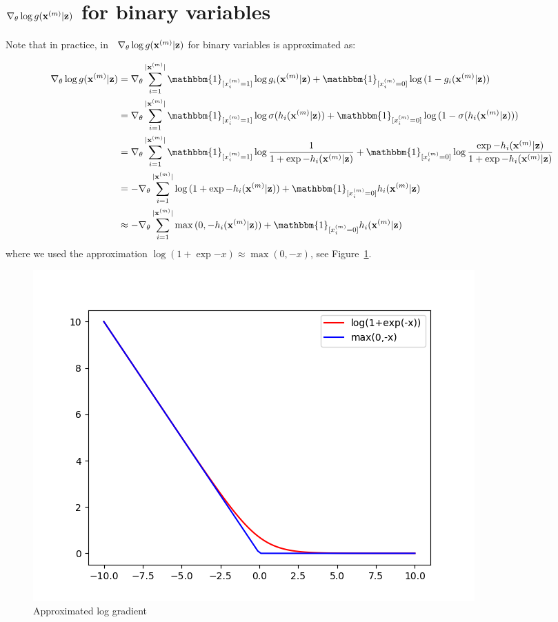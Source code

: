 \documentclass{article}
\begin{document}
\section{$\nabla_\theta\log{g({\mathbf x}^{(m)}|{\mathbf z})}$ for binary variables}

Note that in practice, in~\cite{bgan}
$\nabla_\theta\log{g({\mathbf x}^{(m)}|{\mathbf z})}$ for binary variables is
approximated as:

\begin{align*}
\nabla_\theta\log{g(\x^{(m)}|\z)} & = \nabla_\theta \sum_{i=1}^{|\x^{(m)}|} \mathbbm{1}_{[x_i^{(m)} = 1]} \log{g_i(\x^{(m)}|\z)} + \mathbbm{1}_{[x_i^{(m)} = 0]} \log{(1 - g_i(\x^{(m)}|\z))} \\
& = \nabla_\theta \sum_{i=1}^{|\x^{(m)}|} \mathbbm{1}_{[x_i^{(m)} = 1]} \log{\sigma(h_i(\x^{(m)}|\z))} + \mathbbm{1}_{[x_i^{(m)} = 0]} \log{(1 - \sigma(h_i(\x^{(m)}|\z)))} \\
& =  \nabla_\theta \sum_{i=1}^{|\x^{(m)}|} \mathbbm{1}_{[x_i^{(m)} = 1]} \log{\frac{1}{1+\exp{-h_i(\x^{(m)}|\z)}}}+ \mathbbm{1}_{[x_i^{(m)} = 0]} \log{\frac{\exp{-h_i(\x^{(m)}|\z)}}{1+\exp{-h_i(\x^{(m)}|\z)}}} \\                                
& =  - \nabla_\theta \sum_{i=1}^{|\x^{(m)}|}\log{(1+\exp{-h_i(\x^{(m)}|\z)})} + \mathbbm{1}_{[x_i^{(m)} = 0]}h_i(\x^{(m)}|\z) \\
& \approx  - \nabla_\theta \sum_{i=1}^{|\x^{(m)}|}\max{(0,-h_i(\x^{(m)}|\z))} + \mathbbm{1}_{[x_i^{(m)} = 0]}h_i(\x^{(m)}|\z) \\
\end{align*}
where we used the approximation $\log{(1+\exp{-x})} \approx \max{(0,-x)}$, see Figure~\ref{fig:approx}.

\begin{figure}
  \centering
  \includegraphics[width=.7\textwidth]{Figures/approx}
  \caption{\label{fig:approx}Approximated log gradient}
\end{figure}
\end{document}
